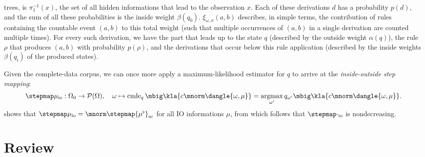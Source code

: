 trees, is $\pi_1^{-1}(x)$, the set of all hidden informations that lead to the
observation $x$. Each of these derivations $d$ has a probability $p(d)$, and
the sum of all these probabilities is the inside weight $\beta(q_0)$.
$\xi_{\omega,x}(a,b)$ describes, in simple terms, the contribution of rules
containing the countable event $(a,b)$ to this total weight (such that
multiple occurrences of $(a,b)$ in a single derivation are counted multiple
times). For every such derivation, we have the part that leads up to the state
$q$ (described by the outside weight $\alpha(q)$), the rule $\rho$ that
produces $(a,b)$ with probability $p(\rho)$, and the derivations that occur
below this rule application (described by the inside weights $\beta(q_i)$ of
the produced states).

Given the complete-data corpus, we can once more apply a maximum-likelihood
estimator for $q$ to arrive at the \emph{inside-outside step mapping}:
\[
 \stepmap\mu_\mathrm{io}: \Omega_0 \to \up(\Omega), \quad
 \omega \mapsto \cmle_q\mbig\kla{c\mnorm\dangle{\omega,\mu}} = \argmax_{\omega'} q_{\omega'}\mbig\kla{c\mnorm\dangle{\omega,\mu}}.
\]
\cite[pp.~16]{bucstuvog15} shows that $\stepmap\mu_\mathrm{io} =
\mnorm\stepmap{\mu^\flat}_\mathrm{sc}$ for all IO informations $\mu$, from
which follows that $\stepmap\cdot_\mathrm{io}$ is nondecreasing.

\section{Review}

